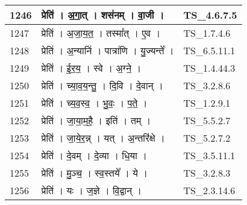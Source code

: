 \documentclass[17pt]{extarticle}
\begin{document}
\begin{longtable}{||p{0.4in}||p{4.9in}||p{0.9in}||}
    \hline
        
    1246 & प्रेति॑   ।   अ॒गा॒त्   ।   शस॑नम्   ।   वा॒जी   ।    & TS\_4.6.7.5       \\
    
    \hline
        
    1247 & प्रेति॑   ।   अ॒जा॒य॒त॒   ।   तस्मा᳚त्   ।   ए॒व   ।    & TS\_1.7.4.6       \\
    
    \hline
        
    1248 & प्रेति॑   ।   अ॒न्यानि॑   ।   पात्रा॑णि   ।   यु॒ज्यन्ते᳚   ।    & TS\_6.5.11.1       \\
    
    \hline
        
    1249 & प्रेति॑   ।   ई॒र॒य॒   ।   स्वे   ।   अ॒ग्ने॒   ।    & TS\_1.4.44.3       \\
    
    \hline
        
    1250 & प्रेति॑   ।   च्या॒व॒य॒न्तु॒   ।   दि॒वि   ।   दे॒वान्   ।    & TS\_3.2.8.6       \\
    
    \hline
        
    1251 & प्रेति॑   ।   च्य॒व॒स्व॒   ।   भु॒वः॒   ।   प॒ते॒   ।    & TS\_1.2.9.1       \\
    
    \hline
        
    1252 & प्रेति॑   ।   जा॒या॒म॒है॒   ।   इति॑   ।   तम्   ।    & TS\_5.5.2.7       \\
    
    \hline
        
    1253 & प्रेति॑   ।   जा॒ये॒र॒न्न्   ।   यत्   ।   अ॒न्तरि॑क्षे   ।    & TS\_5.2.7.2       \\
    
    \hline
        
    1254 & प्रेति॑   ।   दे॒वम्   ।   दे॒व्या   ।   धि॒या   ।    & TS\_3.5.11.1       \\
    
    \hline
        
    1255 & प्रेति॑   ।   मु॒ञ्च॒   ।   स्व॒स्तये᳚   ।   ये   ।    & TS\_3.2.8.3       \\
    
    \hline
        
    1256 & प्रेति॑   ।   यः   ।   ज॒ज्ञे   ।   वि॒द्वान्   ।    & TS\_2.3.14.6       \\
    
    \hline
        

\end{longtable}
\end{document}
